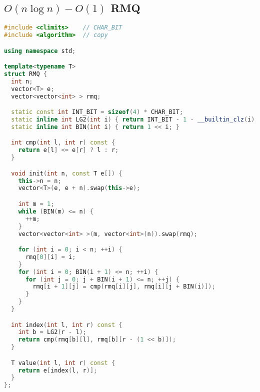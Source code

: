\subsection{$O(n\log n)-O(1)$ RMQ}
\begin{lstlisting}[language=C++]
#include <climits>    // CHAR_BIT
#include <algorithm>  // copy

using namespace std;

template<typename T>
struct RMQ {
  int n;
  vector<T> e;
  vector<vector<int> > rmq;

  static const int INT_BIT = sizeof(4) * CHAR_BIT;
  static inline int LG2(int i) { return INT_BIT - 1 - __builtin_clz(i); }
  static inline int BIN(int i) { return 1 << i; }

  int cmp(int l, int r) const {
    return e[l] <= e[r] ? l : r;
  }

  void init(int n, const T e[]) {
    this->n = n;
    vector<T>(e, e + n).swap(this->e);

    int m = 1;
    while (BIN(m) <= n) {
      ++m;
    }
    vector<vector<int> >(m, vector<int>(n)).swap(rmq);

    for (int i = 0; i < n; ++i) {
      rmq[0][i] = i;
    }
    for (int i = 0; BIN(i + 1) <= n; ++i) {
      for (int j = 0; j + BIN(i + 1) <= n; ++j) {
        rmq[i + 1][j] = cmp(rmq[i][j], rmq[i][j + BIN(i)]);
      }
    }
  }

  int index(int l, int r) const {
    int b = LG2(r - l);
    return cmp(rmq[b][l], rmq[b][r - (1 << b)]);
  }

  T value(int l, int r) const {
    return e[index(l, r)];
  }
};


\end{lstlisting}
